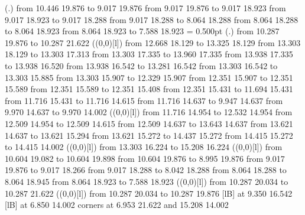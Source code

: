 {\setplotsymbol ({\thinlinefont .})
\putrule from 10.446 19.876 to  9.017 19.876
\putrule from  9.017 19.876 to  9.017 18.923
\putrule from  9.017 18.923 to  9.017 18.288
\putrule from  9.017 18.288 to  8.064 18.288
\putrule from  8.064 18.288 to  8.064 18.923
\putrule from  8.064 18.923 to  7.588 18.923
%
%
\linethickness= 0.500pt
\setplotsymbol ({\thinlinefont .})
\putrule from 10.287 19.876 to 10.287 21.622
%
%
\linethickness=1pt
\setplotsymbol ({\makebox(0,0)[l]{\tencirc{}}})
\putrule from 12.668 18.129 to 13.325 18.129
\putrule from 13.303 18.129 to 13.303 17.313
\putrule from 13.303 17.335 to 13.960 17.335
\putrule from 13.938 17.335 to 13.938 16.520
\putrule from 13.938 16.542 to 13.281 16.542
\putrule from 13.303 16.542 to 13.303 15.885
\putrule from 13.303 15.907 to 12.329 15.907
\putrule from 12.351 15.907 to 12.351 15.589
\putrule from 12.351 15.589 to 12.351 15.408
\putrule from 12.351 15.431 to 11.694 15.431
\putrule from 11.716 15.431 to 11.716 14.615
\putrule from 11.716 14.637 to  9.947 14.637
\putrule from  9.970 14.637 to  9.970 14.002
%
%
\linethickness=1pt
\setplotsymbol ({\makebox(0,0)[l]{\tencirc{}}})
\putrule from 11.716 14.954 to 12.532 14.954
\putrule from 12.509 14.954 to 12.509 14.615
\putrule from 12.509 14.637 to 13.643 14.637
\putrule from 13.621 14.637 to 13.621 15.294
\putrule from 13.621 15.272 to 14.437 15.272
\putrule from 14.415 15.272 to 14.415 14.002
%
%
\linethickness=1pt
\setplotsymbol ({\makebox(0,0)[l]{\tencirc{}}})
\putrule from 13.303 16.224 to 15.208 16.224
%
%
\linethickness=1pt
\setplotsymbol ({\makebox(0,0)[l]{\tencirc{}}})
\putrule from 10.604 19.082 to 10.604 19.898
\putrule from 10.604 19.876 to  8.995 19.876
\putrule from  9.017 19.876 to  9.017 18.266
\putrule from  9.017 18.288 to  8.042 18.288
\putrule from  8.064 18.288 to  8.064 18.945
\putrule from  8.064 18.923 to  7.588 18.923
%
%
\linethickness=1pt
\setplotsymbol ({\makebox(0,0)[l]{\tencirc{}}})
\putrule from 10.287 20.034 to 10.287 21.622
%
%
\linethickness=1pt
\setplotsymbol ({\makebox(0,0)[l]{\tencirc{}}})
\putrule from 10.287 20.034 to 10.287 19.876
%
%
 [lB] at  9.350 16.542
%
%
 [lB] at  6.850 14.002
\linethickness=0pt
\putrectangle corners at  6.953 21.622 and 15.208 14.002
\endpicture}
